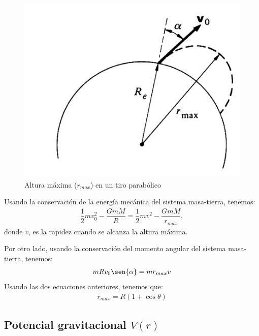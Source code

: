 \begin{figure}[h]
\begin{center}
\includegraphics[scale=0.3]{gravitacion/tiro}
\end{center}
\caption{Altura máxima ($r_{max}$) en un tiro parabólico}
\label{fig-tiro}
\end{figure}

Usando la conservación de la energía mecánica del sistema masa-tierra, tenemos:
\begin{eqnarray}
\dfrac{1}{2}m v_{0}^{2} - \dfrac{GmM}{R}=\dfrac{1}{2}m v^{2} - \dfrac{GmM}{r_{max}},
\end{eqnarray}
donde $v$, es la rapidez cuando se alcanza la altura máxima.

Por otro lado, usando la conservación del momento angular del sistema masa-tierra, tenemos:
\begin{eqnarray}
mRv_{0}\sen{\alpha}=mr_{max}v
\end{eqnarray}
Usando las dos ecuaciones anteriores, tenemos que:
\begin{eqnarray}
r_{max}=R(1+\cos{\theta})
\end{eqnarray}










\subsection{Potencial gravitacional $V(r)$}

